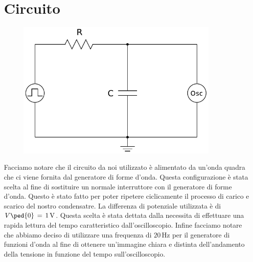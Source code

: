 \section*{Circuito}

\begin{figure}
    \includegraphics[width=100mm]{schema.pdf}
\end{figure}

Facciamo notare che il circuito da noi utilizzato è alimentato da un'onda quadra che ci viene fornita dal generatore di forme d'onda. Questa configurazione è stata scelta al fine di sostituire un normale interruttore con il generatore di forme d'onda. Questo è stato fatto per poter ripetere ciclicamente il processo di carico e scarico del nostro condensatre.
La differenza di potenziale utilizzata è di $V\ped{0} \,=\, 1\,\si{\volt}$. Questa scelta è stata dettata dalla necessita di effettuare una rapida lettura del tempo caratteristico dall'oscilloscopio. Infine facciamo notare che abbiamo deciso di utilizzare una frequenza di $20\,\si{\hertz}$ per il generatore di funzioni d'onda al fine di ottenere un'immagine chiara e distinta dell'andamento della tensione in funzione del tempo sull'oscilloscopio.